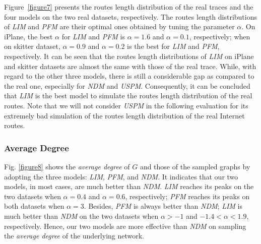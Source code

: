 \documentclass[a4paper]{llncs}
\begin{document}
Figure~\ref{figure7} presents the routes length distribution of the real
traces and the four models on the two real datasets, respectively. The routes length distributions of \textit{LIM} and \textit{PFM} are their optimal ones obtained by tuning the parameter $\alpha$. On iPlane, the best $\alpha$ for \textit{LIM} and
\textit{PFM} is $\alpha=1.6$ and $\alpha=0.1$, respectively; when on skitter dataset, $\alpha=0.9$ and $\alpha=0.2$ is the best for \textit{LIM} and \textit{PFM}, respectively. It can be seen that the routes length
distributions of \textit{LIM} on iPlane and skitter datasets are
almost the same with those of the real trace. While, with regard to the other
three models, there is still a considerable gap as compared to the real one,
especially for \textit{NDM} and \textit{USPM}. Consequently, it
can be concluded that \textit{LIM} is the best model to
simulate the routes length distribution of the real routes. Note that we will not consider \textit{USPM} in the following evaluation for its extremely bad simulation of the routes length distribution of the real Internet routes.

\begin{figure*}[!t]
\centering
{}
\hspace{2em}
\vspace{-1.7em}
\caption{The {\it average degree} of the sampled graphs by using the three models, compared with that of $G$, on two real datasets: iPlane and skitter, respectively.}
\label{figure8}
\vspace{-0.8em}
\end{figure*}



\subsubsection{Average Degree}
Fig. \ref{figure8} shows the {\it average degree} of $G$ and
those of the sampled graphs by adopting the three models:
\textit{LIM}, \textit{PFM}, and \textit{NDM}. It indicates that our
two models, in most cases, are much better than \textit{NDM}. \textit{LIM} reaches its peaks on the two datasets when $\alpha = 0.4$ and $\alpha = 0.6$, respectively; \textit{PFM} reaches its peaks on both datasets when
$\alpha=3$. Besides,
\textit{PFM} is always better than \textit{NDM}; \textit{LIM} is much better than
\textit{NDM} on the two datasets when $\alpha >
-1$ and $-1.4 < \alpha < 1.9$, respectively. Hence, our two models are more effective
than \textit{NDM} on sampling the {\it average degree} of the underlying network.
\end{document}
